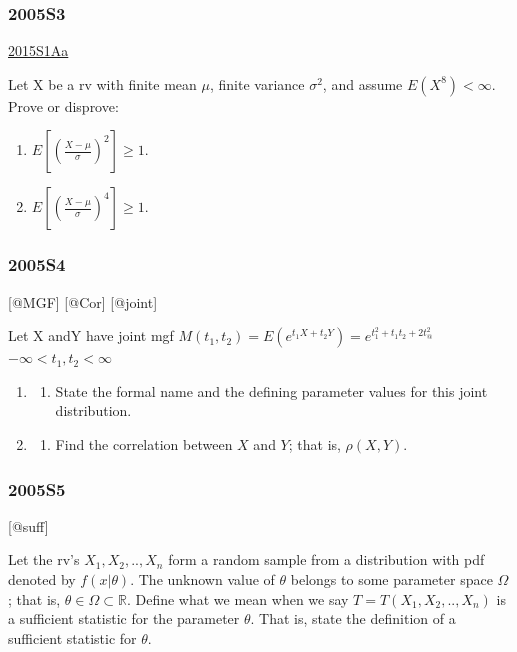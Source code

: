 \documentclass[6pt,Portrait]{article}
\providecommand{\tightlist}{%
  \setlength{\itemsep}{0pt}\setlength{\parskip}{0pt}}
\begin{document}
\hypertarget{s3-1}{%
\subsubsection{2005S3}\label{s3-1}}

\protect\hyperlink{s1aa}{2015S1Aa}

Let X be a rv with finite mean \(\mu\), finite variance \(\sigma^2\),
and assume \(E(X^8)<\infty\). Prove or disprove:

\begin{enumerate}
\def\labelenumi{(\alph{enumi})}
\item
  \(E[(\frac{X-\mu}{\sigma})^2]\ge1\).
\item
  \(E[(\frac{X-\mu}{\sigma})^4]\ge1\).
\end{enumerate}

\hypertarget{s4-1}{%
\subsubsection{2005S4}\label{s4-1}}

{[}@MGF{]} {[}@Cor{]} {[}@joint{]}

Let X andY have joint mgf
\(M(t_1,t_2)=E(e^{t_1X + t_2Y})=e^{t_1^2+t_1t_2+2t_@^2}\)
\(-\infty<t_1,t_2<\infty\)

\begin{enumerate}
\def\labelenumi{(\alph{enumi})}
\item
  \begin{enumerate}
  \def\labelenumii{(\arabic{enumii})}
  \setcounter{enumii}{9}
  \tightlist
  \item
    State the formal name and the defining parameter values for this
    joint distribution.
  \end{enumerate}
\item
  \begin{enumerate}
  \def\labelenumii{(\arabic{enumii})}
  \setcounter{enumii}{4}
  \tightlist
  \item
    Find the correlation between \(X\) and \(Y\); that is,
    \(\rho(X, Y)\).
  \end{enumerate}
\end{enumerate}

\hypertarget{s5-1}{%
\subsubsection{2005S5}\label{s5-1}}

{[}@suff{]}

Let the rv's \(X_1,X_2,..,X_n\) form a random sample from a distribution
with pdf denoted by \(f(x|\theta)\). The unknown value of \(\theta\)
belongs to some parameter space \(\Omega\); that is,
\(\theta\in\Omega\subset\mathbb R\). Define what we mean when we say
\(T=T(X_1,X_2,..,X_n)\) is a sufficient statistic for the parameter
\(\theta\). That is, state the definition of a sufficient statistic for
\(\theta\).
\end{document}
